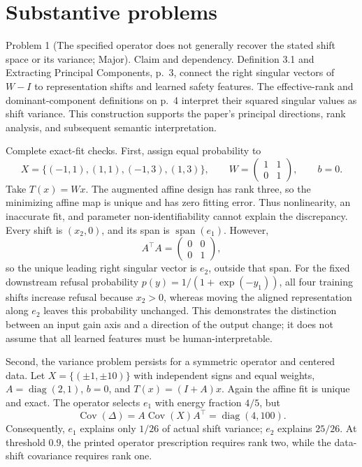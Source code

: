 \documentclass[10pt]{article}
\begin{document}
\section*{Substantive problems}
Problem 1 (The specified operator does not generally recover the stated shift space or its variance; Major).  Claim and dependency. Definition 3.1 and Extracting Principal Components, p. 3, connect the right singular vectors of \(W-I\) to representation shifts and learned safety features. The effective-rank and dominant-component definitions on p. 4 interpret their squared singular values as shift variance. This construction supports the paper’s principal directions, rank analysis, and subsequent semantic interpretation.\par
Complete exact-fit checks. First, assign equal probability to \[X=\{(-1,1),(1,1),(-1,3),(1,3)\},\qquad
W=\begin{pmatrix}1&1\\0&1\end{pmatrix},\qquad b=0.\] Take \(T(x)=Wx\). The augmented affine design has rank three, so the minimizing affine map is unique and has zero fitting error. Thus nonlinearity, an inaccurate fit, and parameter non-identifiability cannot explain the discrepancy. Every shift is \((x_2,0)\), and its span is \(\operatorname{span}(e_1)\). However, \[A^\top A=\begin{pmatrix}0&0\\0&1\end{pmatrix},\] so the unique leading right singular vector is \(e_2\), outside that span. For the fixed downstream refusal probability \(p(y)=1/(1+\exp(-y_1))\), all four training shifts increase refusal because \(x_2>0\), whereas moving the aligned representation along \(e_2\) leaves this probability unchanged. This demonstrates the distinction between an input gain axis and a direction of the output change; it does not assume that all learned features must be human-interpretable.\par
Second, the variance problem persists for a symmetric operator and centered data. Let \(X=\{(\pm1,\pm10)\}\) with independent signs and equal weights, \(A=\operatorname{diag}(2,1)\), \(b=0\), and \(T(x)=(I+A)x\). Again the affine fit is unique and exact. The operator selects \(e_1\) with energy fraction \(4/5\), but \[\operatorname{Cov}(\Delta)=A\operatorname{Cov}(X)A^\top
=\operatorname{diag}(4,100).\] Consequently, \(e_1\) explains only \(1/26\) of actual shift variance; \(e_2\) explains \(25/26\). At threshold \(0.9\), the printed operator prescription requires rank two, while the data-shift covariance requires rank one.\par
\end{document}
